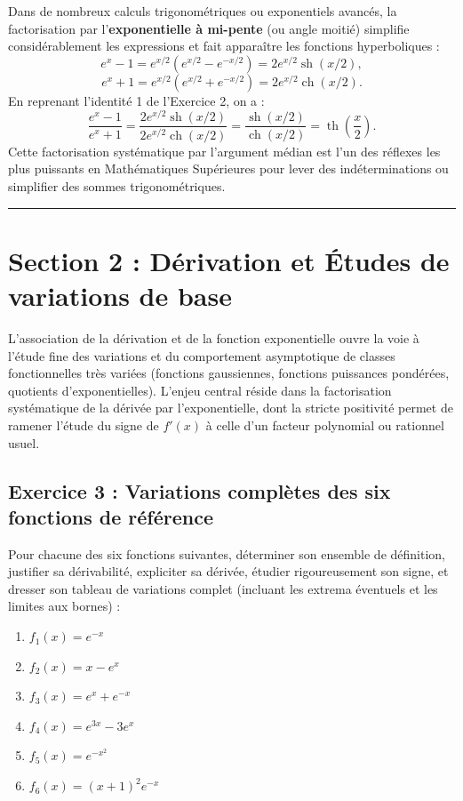 \documentclass[11pt,a4paper]{article}
\newcommand{\sh}{\operatorname{sh}}
\newcommand{\ch}{\operatorname{ch}}
\renewcommand{\th}{\operatorname{th}}
\begin{document}
\begin{methodebox}
Dans de nombreux calculs trigonométriques ou exponentiels avancés, la factorisation par l'\textbf{exponentielle à mi-pente} (ou angle moitié) simplifie considérablement les expressions et fait apparaître les fonctions hyperboliques :
\[
e^x - 1 = e^{x/2}\left(e^{x/2} - e^{-x/2}\right) = 2e^{x/2} \sh(x/2),
\]
\[
e^x + 1 = e^{x/2}\left(e^{x/2} + e^{-x/2}\right) = 2e^{x/2} \ch(x/2).
\]
En reprenant l'identité 1 de l'Exercice 2, on a :
\[
\frac{e^x - 1}{e^x + 1} = \frac{2e^{x/2} \sh(x/2)}{2e^{x/2} \ch(x/2)} = \frac{\sh(x/2)}{\ch(x/2)} = \th\left(\frac{x}{2}\right).
\]
Cette factorisation systématique par l'argument médian est l'un des réflexes les plus puissants en Mathématiques Supérieures pour lever des indéterminations ou simplifier des sommes trigonométriques.
\end{methodebox}

\vspace{0.8cm}
\hrule
\vspace{0.8cm}
\section{Section 2 : Dérivation et Études de variations de base}

L'association de la dérivation et de la fonction exponentielle ouvre la voie à l'étude fine des variations et du comportement asymptotique de classes fonctionnelles très variées (fonctions gaussiennes, fonctions puissances pondérées, quotients d'exponentielles). L'enjeu central réside dans la factorisation systématique de la dérivée par l'exponentielle, dont la stricte positivité permet de ramener l'étude du signe de $f'(x)$ à celle d'un facteur polynomial ou rationnel usuel.

\subsection*{Exercice 3 : Variations complètes des six fonctions de référence}

Pour chacune des six fonctions suivantes, déterminer son ensemble de définition, justifier sa dérivabilité, expliciter sa dérivée, étudier rigoureusement son signe, et dresser son tableau de variations complet (incluant les extrema éventuels et les limites aux bornes) :
\begin{enumerate}[label=\textbf{\arabic*.}]
    \item $f_1(x) = e^{-x}$
    \item $f_2(x) = x - e^x$
    \item $f_3(x) = e^x + e^{-x}$
    \item $f_4(x) = e^{3x} - 3e^x$
    \item $f_5(x) = e^{-x^2}$
    \item $f_6(x) = (x+1)^2 e^{-x}$
\end{enumerate}
\end{document}
